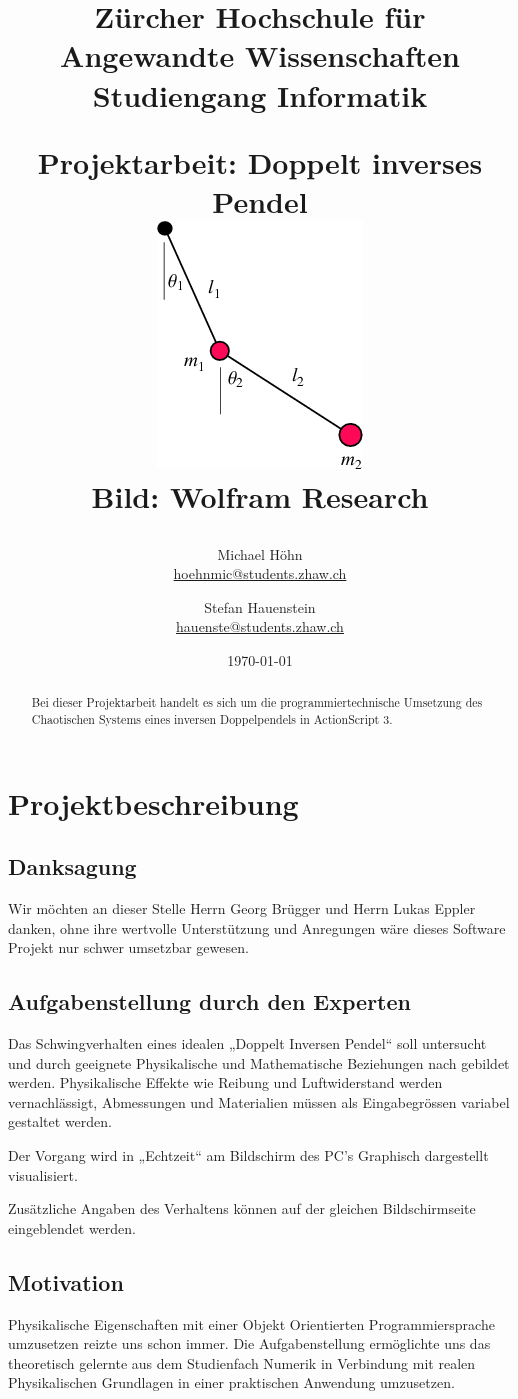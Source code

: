 \documentclass[12pt]{article}
\title{\vspace{-1cm}\linespread{1}\begin{flushleft}\normalsize{Zürcher Hochschule für Angewandte Wissenschaften\\Studiengang Informatik\\}\end{flushleft}\vspace{2cm}\Large{Projektarbeit: Doppelt inverses Pendel}\\\vspace{2cm} \includegraphics[scale=1]{title.png} \\ \tiny{Bild: Wolfram Research}}
\author{Michael Höhn\\\href{mailto:hoehnmic@students.zhaw.ch}{hoehnmic@students.zhaw.ch} \and Stefan Hauenstein\\\href{mailto:hauenste@students.zhaw.ch}{hauenste@students.zhaw.ch}}
\date{\today}
\numberwithin{equation}{subsection}
\begin{document}
\maketitle\thispagestyle{empty}

\newpage

\begin{abstract}
Bei dieser Projektarbeit handelt es sich um die programmiertechnische Umsetzung des Chaotischen Systems eines inversen Doppelpendels in ActionScript 3.
\end{abstract}
\newpage

\tableofcontents

\newpage

\section{Projektbeschreibung}
\subsection{Danksagung}
Wir möchten an dieser Stelle Herrn Georg Brügger und Herrn Lukas Eppler danken, ohne ihre wertvolle Unterstützung und Anregungen wäre dieses Software Projekt nur schwer umsetzbar gewesen.

\subsection{Aufgabenstellung durch den Experten}
Das Schwingverhalten eines idealen „Doppelt Inversen Pendel“ soll untersucht und durch geeignete Physikalische und Mathematische Beziehungen nach gebildet werden. Physikalische Effekte wie Reibung und Luftwiderstand werden vernachlässigt, Abmessungen und Materialien müssen als Eingabegrössen variabel gestaltet werden.

Der Vorgang wird in „Echtzeit“ am Bildschirm des PC's Graphisch dargestellt visualisiert.

Zusätzliche Angaben des Verhaltens können auf der gleichen Bildschirmseite eingeblendet werden.

\subsection{Motivation}
Physikalische Eigenschaften mit einer Objekt Orientierten Programmiersprache umzusetzen reizte uns schon immer. Die  Aufgabenstellung ermöglichte uns das theoretisch gelernte aus dem Studienfach Numerik in Verbindung mit realen Physikalischen Grundlagen in einer praktischen Anwendung umzusetzen.
\end{document}
